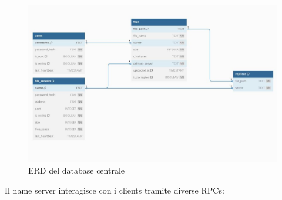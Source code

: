 \documentclass[a4paper, 12pt]{scrreprt}
\begin{document}
            \begin{figure}[H]
                \centering
                \includegraphics[width = 1. \textwidth]{img/ERD.jpg}
                \caption{ERD del database centrale}
            \end{figure}

            Il name server interagisce con i clients tramite diverse RPCs:
\end{document}
